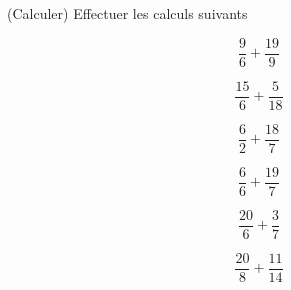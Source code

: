  (Calculer) Effectuer les calculs suivants

\begin{multicols}{6}
$$\dfrac{9}{6}+\dfrac{19}{9}$$

$$\dfrac{15}{6}+\dfrac{5}{18}$$

$$\dfrac{6}{2}+\dfrac{18}{7}$$

$$\dfrac{6}{6}+\dfrac{19}{7}$$

$$\dfrac{20}{6}+\dfrac{3}{7}$$

$$\dfrac{20}{8}+\dfrac{11}{14}$$

\end{multicols}